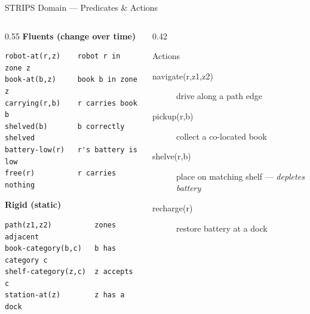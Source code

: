 \documentclass{beamer}
\begin{document}
\begin{frame}[fragile]{STRIPS Domain --- Predicates \& Actions}
\begin{columns}
\begin{column}{0.55\textwidth}
\textbf{Fluents (change over time)}
\begin{lstlisting}
robot-at(r,z)    robot r in zone z
book-at(b,z)     book b in zone z
carrying(r,b)    r carries book b
shelved(b)       b correctly shelved
battery-low(r)   r's battery is low
free(r)          r carries nothing
\end{lstlisting}
\vspace{0.3em}
\textbf{Rigid (static)}
\begin{lstlisting}
path(z1,z2)          zones adjacent
book-category(b,c)   b has category c
shelf-category(z,c)  z accepts c
station-at(z)        z has a dock
\end{lstlisting}
\end{column}
\begin{column}{0.42\textwidth}
\begin{block}{Actions}
\begin{description}
  \item[navigate(r,z1,z2)] drive along a path edge
  \item[pickup(r,b)] collect a co-located book
  \item[shelve(r,b)] place on matching shelf --- \emph{depletes battery}
  \item[recharge(r)] restore battery at a dock
\end{description}
\end{block}
\end{column}
\end{columns}
\end{frame}
\end{document}
